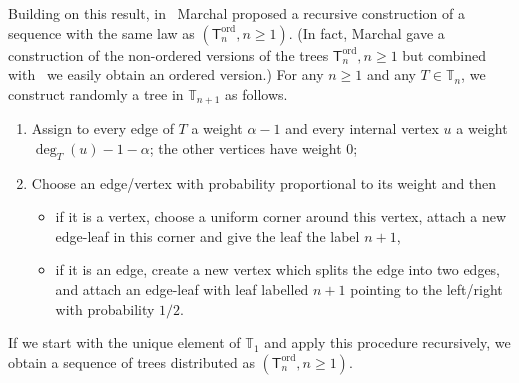 \documentclass[AHL,Unicode,longabstracts,published]{cedram}
\newcommand{\ord}{\mathrm{ord}}
\newcommand{\sT}{\mathsf{T}}
\newcommand{\A}{\mathbb{T}}
\begin{document}
Building on this result, in~\cite{Marchal} Marchal proposed a recursive construction of a sequence with the same law as $(\sT^{\ord}_n,n \geq 1)$. (In fact, Marchal gave a construction of the non-ordered versions of the trees $\sT^{\ord}_n,n \geq 1$ but combined with~\cite[Section~2.3]{Marchal} we easily obtain an ordered version.) For any $n \geq 1$ and any $T\in\A_n$, we construct randomly a tree in $\A_{n+1}$ as follows.
\begin{enumerate}
\item Assign to every edge of $T$ a weight $\alpha-1$ and every internal vertex $u$ a weight $\deg_T(u)-1-\alpha$; the other vertices have weight 0;
\item Choose an edge/vertex with probability proportional to its weight and then
\begin{itemize}
\item if it is a vertex, choose a uniform corner around this vertex, attach a new edge-leaf in this corner and give the leaf the label $n+1$,
\item if it is an edge, create a new vertex which splits the edge into two edges, and attach an edge-leaf with leaf labelled $n+1$ pointing to the left/right with probability $1/2$.
\end{itemize}
\end{enumerate}
If we start with the unique element of $\A_1$ and apply this procedure recursively, we obtain a sequence of trees distributed as $(\sT^{\ord}_n,n \geq 1)$.
\end{document}
